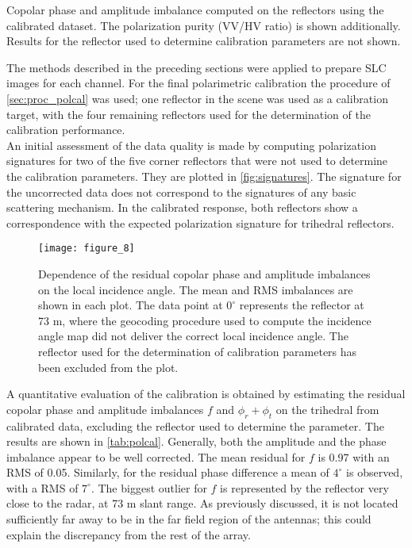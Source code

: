 								
\begin{table}[h]
	\centering
	\caption{Copolar phase and amplitude imbalance computed on the reflectors using the calibrated dataset. The polarization purity (VV/HV ratio) is shown additionally. Results for the reflector used to determine calibration parameters are not shown.}
	\label{tab:polcal}
\end{table}		
The methods described in the preceding sections were applied to prepare SLC images for each channel. For the final polarimetric calibration the procedure of \autoref{sec:proc_polcal} was used; one reflector in the scene was used as a calibration target, with the four remaining reflectors used for the determination of the calibration performance.\\
An initial assessment of the data quality is made  by computing polarization signatures\cite{VanZyl1987} for two of the five corner reflectors that were not used to determine the calibration parameters. They are plotted in \autoref{fig:signatures}.
The signature for the uncorrected data does not correspond to the signatures of any basic scattering mechanism. In the calibrated response, both reflectors show a correspondence with the expected polarization signature for trihedral reflectors.\\
\begin{figure*}[ht!]
	\centering
	\texttt{[image: figure\_8]}
	\caption{Dependence of the residual copolar phase and amplitude imbalances on the local incidence angle. The mean and RMS imbalances are shown in each plot. The data point at $0^\circ$ represents the reflector at 73 m, where the geocoding procedure used to compute the incidence angle map did not deliver the correct  local incidence angle. The reflector used for the determination of calibration parameters has been excluded from the plot.}
	\label{fig:inc_angle_trend}
\end{figure*}
A quantitative evaluation of the calibration is obtained by estimating the residual copolar phase and amplitude imbalances $f$ and $\phi_r + \phi_t$ on the trihedral from calibrated data, excluding the reflector used to determine the parameter. The results are shown in \autoref{tab:polcal}. Generally, both the amplitude and the phase imbalance appear to be well corrected. The mean residual for $f$ is 0.97 with an RMS of 0.05. Similarly, for the residual phase difference a mean of $4^\circ$ is observed, with a RMS of $7^\circ$. The biggest outlier for $f$ is represented by the reflector very close to the radar, at 73 m slant range. As previously discussed, it is not located sufficiently far away to be in the far field region of the antennas; this could explain the discrepancy from the rest of the array.
